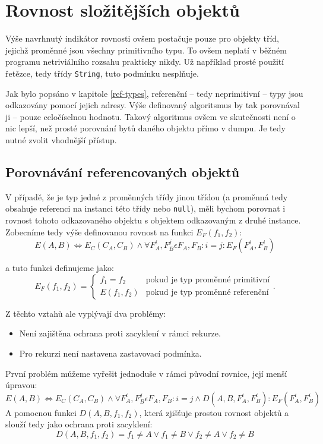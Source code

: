 \section{Rovnost složitějších objektů}
Výše navrhnutý indikátor rovnosti ovšem postačuje pouze pro objekty tříd, jejichž proměnné jsou všechny primitivního typu. To ovšem neplatí v běžném programu netriviálního rozsahu prakticky nikdy. Už například prosté použití řetězce, tedy třídy \texttt{String}, tuto podmínku nesplňuje.

Jak bylo popsáno v kapitole \ref{ref-types}, referenční -- tedy neprimitivní -- typy jsou odkazovány pomocí jejich adresy. Výše definovaný algoritsmus by tak porovnával ji -- pouze celočíselnou hodnotu. Takový algoritmus ovšem ve skutečnosti není o nic lepší, než prosté porovnání bytů daného objektu přímo v dumpu. Je tedy nutné zvolit vhodnější přístup.

\subsection{Porovnávání referencovaných objektů}
V případě, že je typ jedné z proměnných třídy jinou třídou (a proměnná tedy obsahuje referenci na instanci této třídy nebo \texttt{null}), měli bychom porovnat i rovnost tohoto odkazovaného objektu s objektem odkazovaným z druhé instance. Zobecníme tedy výše definovanou rovnost na funkci $E_F(f_1, f_2)$:
    $$ E(A, B) \Leftrightarrow E_C(C_A, C_B) \wedge \forall F_A^i, F_B^j \epsilon F_A, F_B: i = j: E_F(F_A^i, F_B^i)$$

a tuto funkci definujeme jako:
\begin{equation}
    E_F(f_1, f_2)=
      \begin{cases}
        f_1 = f_2 & \text{pokud je typ proměnné primitivní} \\
        E(f_1, f_2) & \text{pokud je typ proměnné referenční}
      \end{cases}.
\end{equation}

Z těchto vztahů ale vyplývají dva problémy:

\begin{itemize}
    \item Není zajištěna ochrana proti zacyklení v rámci rekurze.
    \item Pro rekurzi není nastavena zastavovací podmínka.
\end{itemize}

První problém můžeme vyřešit jednoduše v rámci původní rovnice, její menší úpravou:
    $$ E(A, B) \Leftrightarrow E_C(C_A, C_B) \wedge \forall F_A^i, F_B^j \epsilon F_A, F_B: i = j \wedge D(A, B, F_A^i, F_B^i) : E_F(F_A^i, F_B^i)$$
A pomocnou funkci $D(A, B, f_1, f_2)$, která zjišťuje prostou rovnost objektů a slouží tedy jako ochrana proti zacyklení:
    $$
    D(A, B, f_1, f_2) = f_1 \neq A \vee f_1 \neq B \vee f_2 \neq A \vee f_2 \neq B
    $$

